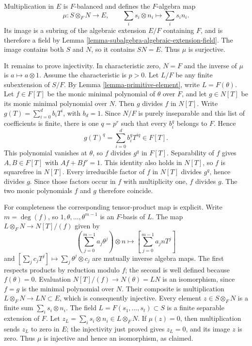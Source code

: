 \medskip\noindent
Multiplication in $E$ is $F$-balanced and defines the $F$-algebra map
$$
\mu:S\otimes_F N\longrightarrow E,\qquad
\sum_i s_i\otimes n_i\longmapsto\sum_i s_i n_i.
$$
Its image is a subring of the algebraic extension $E/F$ containing $F$,
and is therefore a field by Lemma \ref{lemma-subalgebra-algebraic-extension-field}.
The image contains both $S$ and $N$, so it contains $SN=E$.
Thus $\mu$ is surjective.

\medskip\noindent
It remains to prove injectivity. In characteristic zero, $N=F$ and
the inverse of $\mu$ is $a\mapsto a\otimes 1$.
Assume the characteristic is $p>0$. Let $L/F$ be any finite
subextension of $S/F$. By Lemma \ref{lemma-primitive-element},
write $L=F(\theta)$. Let $f\in F[T]$ be the monic minimal polynomial
of $\theta$ over $F$, and let $g\in N[T]$ be its monic minimal
polynomial over $N$. Then $g$ divides $f$ in $N[T]$.
Write $g(T)=\sum_{i=0}^d b_iT^i$, with $b_d=1$.
Since $N/F$ is purely inseparable and this list of coefficients is finite,
there is one $q=p^r$ such that every $b_i^q$ belongs to $F$. Hence
$$
g(T)^q=\sum_{i=0}^d b_i^q T^{iq}\in F[T].
$$
This polynomial vanishes at $\theta$, so $f$ divides $g^q$ in $F[T]$.
Separability of $f$ gives $A,B\in F[T]$ with $Af+Bf'=1$.
This identity also holds in $N[T]$, so $f$ is squarefree in $N[T]$.
Every irreducible factor of $f$ in $N[T]$ divides $g^q$, hence divides $g$.
Since those factors occur in $f$ with multiplicity one, $f$ divides $g$.
The two monic polynomials $f$ and $g$ therefore coincide.

\medskip\noindent
For completeness the corresponding tensor-product map is explicit.
Write $m=\deg(f)$, so $1,\theta,\ldots,\theta^{m-1}$ is an $F$-basis of $L$.
The map $L\otimes_F N\longrightarrow N[T]/(f)$ given by
$$
\left(\sum_{j=0}^{m-1}a_j\theta^j\right)\otimes n
\longmapsto\left[\sum_{j=0}^{m-1}a_j n T^j\right]
$$
and $[\sum_j c_jT^j]\mapsto\sum_j\theta^j\otimes c_j$
are mutually inverse algebra maps. The first respects products by reduction
modulo $f$; the second is well defined because $f(\theta)=0$.
Evaluation $N[T]/(f)\to N(\theta)=LN$ is an isomorphism, since $f=g$
is the minimal polynomial over $N$. Their composite is multiplication
$L\otimes_F N\to LN\subset E$, which is consequently injective.
Every element $z\in S\otimes_F N$ is a finite sum $\sum_i s_i\otimes n_i$.
The field $L=F(s_1,\ldots,s_t)\subset S$ is a finite separable extension
of $F$. Let $z_L=\sum_i s_i\otimes n_i\in L\otimes_F N$.
If $\mu(z)=0$, then multiplication sends $z_L$ to zero in $E$;
the injectivity just proved gives $z_L=0$, and its image $z$ is zero.
Thus $\mu$ is injective and hence an isomorphism, as claimed.
